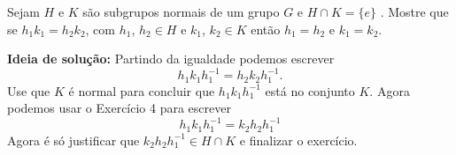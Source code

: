 \documentclass[12pt]{exam}
\begin{document}
Sejam $H$ e $K$ são subgrupos normais de um grupo $G$ e $H \cap K = \{e\}$ .
Mostre que se $h_1k_1 = h_2k_2$, com $h_1$, $h_2 \in H$ e $k_1$, $k_2 \in K$ então $h_1 = h_2$ e $k_1 = k_2$.

\textbf{Ideia de solução:} Partindo da igualdade podemos escrever
\[
    h_1k_1h_1^{-1} = h_2k_2h_1^{-1}.
\]
Use que $K$ é normal para concluir que $h_1k_1h_1^{-1}$ está no conjunto $K$. Agora podemos usar o Exercício 4 para escrever
\[
    h_1k_1h_1^{-1} = k_2h_2h_1^{-1}
\]
Agora é só justificar que $k_2h_2h_1^{-1} \in H \cap K$ e finalizar o exercício.
\end{document}
